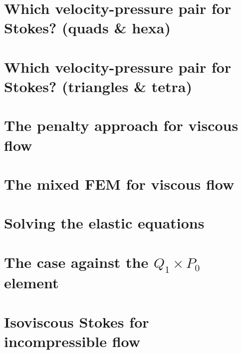 \newpage %
\section{Which velocity-pressure pair for Stokes? (quads \& hexa) \label{ss:pair_quads}}

\newpage %
\section{Which velocity-pressure pair for Stokes? (triangles \& tetra) \label{ss:pair_triangles}}

\newpage %
\section{The penalty approach for viscous flow}\label{sec:penalty} %

\newpage %
\section{The mixed FEM for viscous flow} \label{sec:mixed}  %

\newpage %
\section{Solving the elastic equations}  %

\newpage %
\section{The case against the $Q_1\times P_0$ element}  %

\newpage %
\section{Isoviscous Stokes for incompressible flow}\label{ss:isovisc}  %

